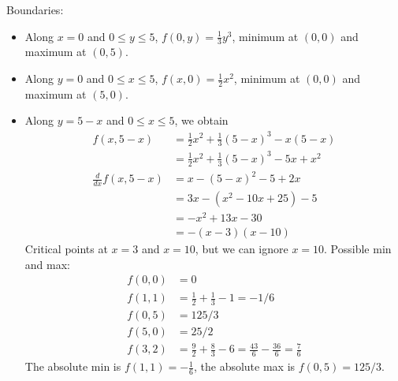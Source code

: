 \begin{parts}
    \ifnum {} {\color{DarkBlue}
    Boundaries:
    \begin{itemize}
        \item Along $x=0$ and $0\le y \le 5$, $f(0,y) = \frac13y^3$, minimum at $(0,0)$ and maximum at $(0,5)$. 
        \item Along $y=0$ and $0\le x \le 5$, $f(x,0) = \frac12x^2$, minimum at $(0,0)$ and maximum at $(5,0)$. 
        \item Along $y=5-x$ and $0\le x \le 5$, we obtain \begin{align}
            f(x,5-x) &= \frac12x^2 +\frac13(5-x)^3-x(5-x) \\
            &= \frac12x^2+\frac13(5-x)^3-5x+x^2\\
            \frac{d}{dx}f(x,5-x) &= x-(5-x)^2-5+2x \\
            &= 3x-(x^2-10x+25)-5 \\
            &= -x^2 + 13x-30 \\
            &= -(x-3)(x-10)
        \end{align}
        Critical points at $x=3$ and $x=10$, but we can ignore $x=10$. Possible min and max: 
        \begin{align}
            f(0,0) &= 0 \\
            f(1,1) &= \frac12+\frac13-1 = -1/6 \\
            f(0,5) &= 125/3 \\
            f(5,0) &= 25/2 \\ 
            f(3,2) &= \frac92 + \frac83 - 6 = \frac{43}{6} - \frac{36}{6} = \frac{7}{6}
        \end{align}
        The absolute min is $f(1,1)=-\frac16$, the absolute max is $f(0,5) = 125/3$. 
    \end{itemize}
    
    } 
    \else 
    \vspace{2 cm}
    \fi
\end{parts}
\fi







